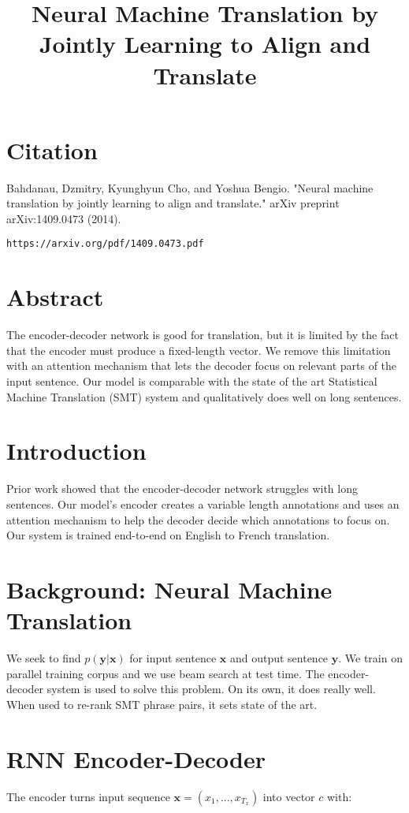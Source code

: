 \documentclass[a4paper]{article}
\title{Neural Machine Translation by Jointly Learning to Align and Translate}
\date{}
\begin{document}
\maketitle

\section{Citation}
Bahdanau, Dzmitry, Kyunghyun Cho, and Yoshua Bengio. "Neural machine translation by jointly learning to align and translate." arXiv preprint arXiv:1409.0473 (2014).

\begin{verbatim}
https://arxiv.org/pdf/1409.0473.pdf
\end{verbatim}

\section{Abstract}
The encoder-decoder network is good for translation, but it is limited by
the fact that the encoder must produce a fixed-length vector. We remove this
limitation with an attention mechanism that lets the decoder focus on relevant
parts of the input sentence. Our model is comparable with the state of the
art Statistical Machine Translation (SMT) system and qualitatively does
well on long sentences.

\section{Introduction}
Prior work showed that the encoder-decoder network struggles with long
sentences. Our model's encoder creates a variable length annotations and
uses an attention mechanism to help the decoder decide which annotations
to focus on. Our system is trained end-to-end on English to French
translation.

\section{Background: Neural Machine Translation}
We seek to find $p(\mathbf{y} | \mathbf{x})$ for input sentence $\mathbf{x}$
and output sentence $\mathbf{y}$. We train on parallel training corpus and
we use beam search at test time. The encoder-decoder system is used to
solve this problem. On its own, it does really well. When used to re-rank
SMT phrase pairs, it sets state of the art.

\section{RNN Encoder-Decoder}
The encoder turns input sequence $\mathbf{x} = (x_1, ..., x_{T_x})$ into
vector $c$ with:
\end{document}
